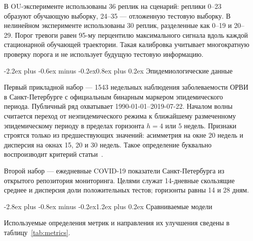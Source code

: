 \documentclass[12pt,a4paper]{article}
\makeatletter
\numberwithin{table}{section}
\numberwithin{figure}{section}
\renewcommand\section{\@startsection{section}{1}{0pt}
  {-2.8ex plus -0.8ex minus -0.2ex}{1.2ex plus 0.2ex}
  {\centering\normalfont\normalsize\bfseries}}
\renewcommand\subsection{\@startsection{subsection}{2}{0pt}
  {-2.2ex plus -0.6ex minus -0.2ex}{0.8ex plus 0.2ex}
  {\normalfont\normalsize\bfseries}}
\makeatother
\begin{document}
В OU-эксперименте использованы 36 реплик на сценарий: реплики 0--23 образуют
обучающую выборку, 24--35 --- отложенную тестовую выборку. В нелинейном
эксперименте использованы 30 реплик, разделенные как 0--19 и 20--29. Порог
тревоги равен 95-му перцентилю максимального сигнала вдоль каждой стационарной
обучающей траектории. Такая калибровка учитывает многократную проверку порога и
не использует будущую тестовую информацию.

\subsection{Эпидемиологические данные}

Первый прикладной набор --- 1543 недельных наблюдения заболеваемости ОРВИ в
Санкт-Петербурге с официальным бинарным маркером эпидемического периода.
Публичный ряд охватывает 1990-01-01--2019-07-22. Началом волны считается
переход от неэпидемического режима к ближайшему размеченному эпидемическому
периоду в пределах горизонта $h=4$ или $5$ недель. Признаки строятся только из
предшествующих значений: асимметрия на окне 20 недель и дисперсия на окнах 15,
20 и 30 недель. Такое определение буквально воспроизводит критерий
статьи~\cite{lazutov2026}.

Второй набор --- ежедневные COVID-19 показатели Санкт-Петербурга из открытого
репозитория мониторинга. Целями служат 14-дневные скользящие среднее и
дисперсия доли положительных тестов; горизонты равны 14 и 28 дням.

\clearpage
\section{Сравниваемые модели}

Используемые определения метрик и направления их улучшения сведены в
таблицу~\ref{tab:metrics}.
\end{document}
